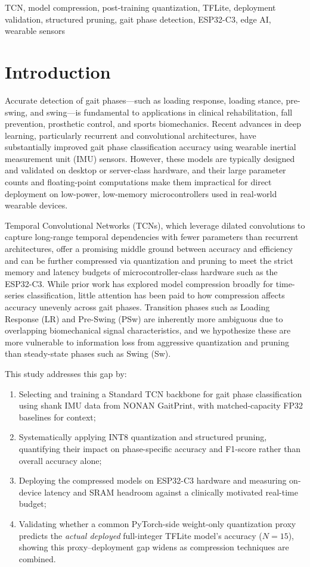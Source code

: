 \documentclass[conference]{IEEEtran}
\begin{document}
\begin{IEEEkeywords}
TCN, model compression, post-training quantization, TFLite, deployment validation, structured
pruning, gait phase detection, ESP32-C3, edge AI, wearable sensors
\end{IEEEkeywords}

\section{Introduction}

Accurate detection of gait phases---such as loading response, loading stance, pre-swing, and
swing---is fundamental to applications in clinical rehabilitation, fall prevention, prosthetic
control, and sports biomechanics. Recent advances in deep learning, particularly recurrent and
convolutional architectures, have substantially improved gait phase classification accuracy using
wearable inertial measurement unit (IMU) sensors. However, these models are typically designed and
validated on desktop or server-class hardware, and their large parameter counts and floating-point
computations make them impractical for direct deployment on low-power, low-memory microcontrollers
used in real-world wearable devices.

Temporal Convolutional Networks (TCNs), which leverage dilated convolutions to capture long-range
temporal dependencies with fewer parameters than recurrent architectures, offer a promising middle
ground between accuracy and efficiency and can be further compressed via quantization and pruning
to meet the strict memory and latency budgets of microcontroller-class hardware such as the ESP32-C3.
While prior work has explored model compression broadly for time-series classification, little
attention has been paid to how compression affects accuracy unevenly across gait phases. Transition
phases such as Loading Response (LR) and Pre-Swing (PSw) are inherently more ambiguous due to
overlapping biomechanical signal characteristics, and we hypothesize these are more vulnerable to
information loss from aggressive quantization and pruning than steady-state phases such as Swing (Sw).

This study addresses this gap by:
\begin{enumerate}
  \item Selecting and training a Standard TCN backbone for gait phase classification using shank
        IMU data from NONAN GaitPrint, with matched-capacity FP32 baselines for context;
  \item Systematically applying INT8 quantization and structured pruning, quantifying their impact
        on phase-specific accuracy and F1-score rather than overall accuracy alone;
  \item Deploying the compressed models on ESP32-C3 hardware and measuring on-device latency and
        SRAM headroom against a clinically motivated real-time budget;
  \item Validating whether a common PyTorch-side weight-only quantization proxy predicts the
        \emph{actual deployed} full-integer TFLite model's accuracy ($N{=}15$), showing this
        proxy--deployment gap widens as compression techniques are combined.
\end{enumerate}
\end{document}
